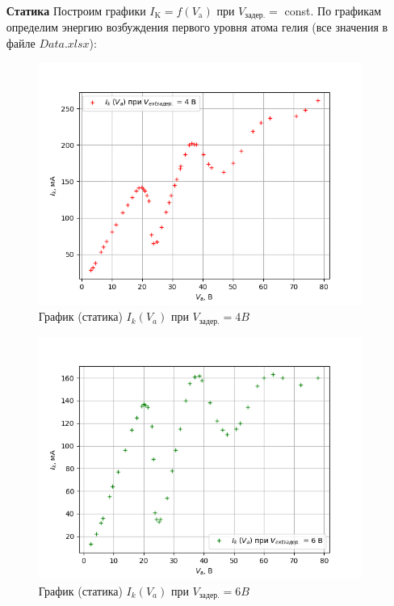 \documentclass[a4paper, 12pt]{article}%
\begin{document}
\begin{itemize}
\begin{table}[!h]
\label{tab1}
\end{table}

\item  [\textbf{Статика}] Построим графики $I_{\mathrm{K}}=f\left(V_{\mathrm{a}}\right)$ при $V_{\text{задер.}}=$ const. По графикам определим энергию возбуждения первого уровня атома гелия (все значения в файле $Data.xlsx$):

\begin{figure}[!h]
    \centering
    \includegraphics[scale=0.55]{graph4.png}
    \caption{График (статика) $I_k(V_a)$ при $V_{\text{задер.}} = 4 B$}
    \label{graph:4}
\end{figure}

\begin{figure}[!h]
    \centering
    \includegraphics[scale=0.55]{graph5.png}
    \caption{График (статика) $I_k(V_a)$ при $V_{\text{задер.}} = 6 B$}
    \label{graph:5}
\end{figure}


\end{itemize}
\end{document}
